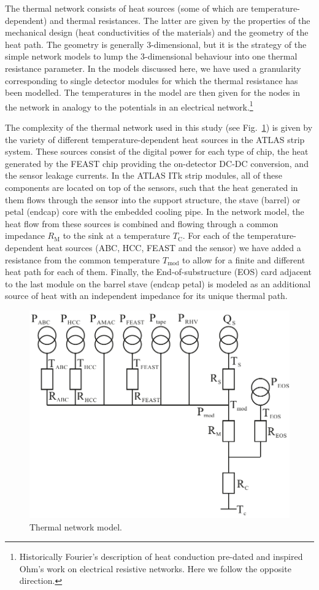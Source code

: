 The thermal network consists of heat sources (some of which are temperature-dependent) and thermal resistances. The latter are given by the properties of the mechanical design (heat conductivities of the materials) and the geometry of the heat path. The geometry is generally 3-dimensional, but it is the strategy of the simple network models to lump the 3-dimensional behaviour into one thermal resistance parameter. In the models discussed here, we have used a granularity corresponding to single detector modules for which the thermal resistance has been modelled. The temperatures in the model are then given for the nodes in the network in analogy to the potentials in an electrical network.\footnote{Historically Fourier's description of heat conduction pre-dated and inspired Ohm's work on electrical resistive networks. Here we follow the opposite direction.}

The complexity of the thermal network used in this study (see Fig.~\ref{fig:thermalmodel}) is given by the variety of different temperature-dependent heat sources in the ATLAS strip system. These sources consist of the digital power for each type of chip, the heat generated by the FEAST chip providing the on-detector DC-DC conversion, and the sensor leakage currents. In the ATLAS ITk strip modules, all of these components are located on top of the sensors, such that the heat generated in them flows through the sensor into the support structure, the stave (barrel) or petal (endcap) core with the embedded cooling pipe. In the network model, the heat flow from these sources is combined and flowing through a common impedance $R_\text{M}$ to the sink at a temperature $T_\text{C}$. For each of the temperature-dependent heat sources (ABC, HCC, FEAST and the sensor) we have added a resistance from the common temperature $T_\text{mod}$ to allow for a finite and different heat path for each of them. Finally, the End-of-substructure (EOS) card adjacent to the last module on the barrel stave (endcap petal) is modeled as an additional source of heat with an independent impedance for its unique thermal path. 

\begin{figure}[ht]
\centering
\includegraphics[width=0.6\linewidth]{figures/Thermalmodel.pdf}
\caption{Thermal network model.}
\label{fig:thermalmodel}
\end{figure}

